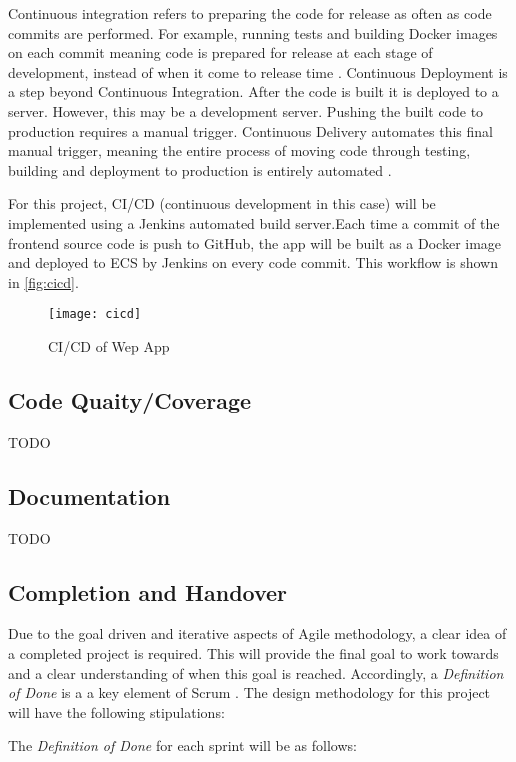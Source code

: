 	Continuous integration refers to preparing the code for release as often as code commits are performed. For example, running tests and building Docker images on each commit meaning code is prepared for release at each stage of development, instead of when it come to release time \citep{ramos}.
	Continuous Deployment is a step beyond Continuous Integration. After the code is built it is deployed to a server. However, this may be a development server. Pushing the built code to production requires a manual trigger. Continuous Delivery automates this final manual trigger, meaning the entire process of moving code through testing, building and deployment to production is entirely automated \citep{ellingwood}.
	
	For this project, CI/CD (continuous development in this case) will be implemented using a Jenkins automated build server.Each time a commit of the frontend source code is push to GitHub, the app will be built as a Docker image and deployed to ECS by Jenkins on every code commit. This workflow is shown in \autoref{fig:cicd}.
	
	\begin{figure}[H]
		\setlength{\belowcaptionskip}{15pt plus 3pt minus 2pt}
		\caption{CI/CD of Wep App}
		\centering
		\texttt{[image: cicd]}
		\label{fig:cicd}
	\end{figure}

	\subsection{Code Quaity/Coverage}
	TODO

	\subsection{Documentation}
	TODO
	
	\subsection{Completion and Handover}
	Due to the goal driven and iterative aspects of Agile methodology, a clear idea of a completed project is required. This will provide the final goal to work towards and a clear understanding of when this goal is reached. Accordingly, a \textit{Definition of Done} is a a key element of Scrum \citep{panchal}. The design methodology for this project will have the following stipulations:
	
	\noindent The \textit{Definition of Done} for each sprint will be as follows:
	
